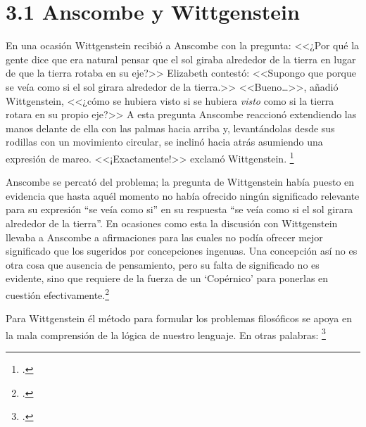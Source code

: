 
\section{3.1 Anscombe y Wittgenstein}

En una ocasión Wittgenstein
recibió a Anscombe con la pregunta: <<¿Por qué la gente dice que era natural
pensar que el sol giraba alrededor de la tierra en lugar de que la tierra rotaba
en su eje?>> Elizabeth contestó: <<Supongo que porque se veía como si el sol
girara alrededor de la tierra.>> <<Bueno\ldots>>, añadió Wittgenstein, <<¿cómo
se hubiera visto si se hubiera \emph{visto} como si la tierra rotara en su
propio eje?>> A esta pregunta Anscombe reaccionó extendiendo las manos delante
de ella con las palmas hacia arriba y, levantándolas desde sus rodillas con un
movimiento circular, se inclinó hacia atrás asumiendo una expresión de mareo.
<<¡Exactamente!>> exclamó Wittgenstein. \footcite[cf.][151]{IWT} 

Anscombe se percató del problema; la
pregunta de Wittgenstein había puesto en evidencia que hasta aquél momento no
había ofrecido ningún significado relevante para su expresión ``se veía como
si'' en su  respuesta ``se veía como si el sol girara alrededor de la tierra''. 
En ocasiones como esta la discusión con Wittgenstein llevaba a Anscombe a
afirmaciones para las cuales no podía ofrecer mejor significado que los
sugeridos por concepciones ingenuas. Una concepción así no es otra cosa que
ausencia de pensamiento, pero su falta de significado no es evidente, sino que
requiere de la fuerza de un `Copérnico' para ponerlas en cuestión
efectivamente.\footcite[cf. 151]{IWT} 



Para Wittgenstein él método para
formular los problemas filosóficos se apoya en la mala comprensión de la lógica
de nuestro lenguaje. En otras palabras: \footcite[prefacio]{tractatus}

